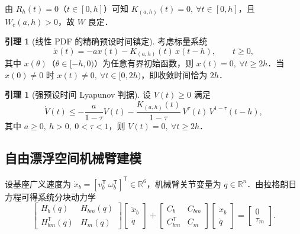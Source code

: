 \documentclass[12pt,a4paper]{article}
\theoremstyle{definition}
\newtheorem{lemma}[theorem]{引理}
\theoremstyle{remark}
\newcommand{\R}{\mathbb{R}}
\newcommand{\T}{\mathsf{T}}
\begin{document}
由 $R_h(t)=0$（$t\in[0,h]$）可知 $K_{(a,h)}(t)=0,\ \forall t\in[0,h]$，且 $W_c(a,h)>0$，故 $W$ 良定．

\begin{lemma}[线性 PDF 的精确预设时间镇定\cite{zhou2022}]
考虑标量系统
\begin{equation}
  \dot x(t)=-a x(t)-K_{(a,h)}(t)\,x(t-h),\qquad t\ge 0,
\end{equation}
其中 $x(\theta)$（$\theta\in[-h,0)$）为任意有界初始函数，则 $x(t)=0,\ \forall t\ge 2h$．当 $x(0)\ne 0$ 时 $x(t)\ne 0,\ \forall t\in[0,2h)$，即收敛时间恰为 $2h$．
\end{lemma}

\begin{lemma}[强预设时间 Lyapunov 判据\cite{ding2024}]
设 $V(t)\ge 0$ 满足
\begin{equation}
  \dot V(t)\le -\frac{a}{1-\tau}V(t)-\frac{K_{(a,h)}(t)}{1-\tau}\,V^{\tau}(t)\,V^{1-\tau}(t-h),
\end{equation}
其中 $a\ge 0,\ h>0,\ 0<\tau<1$，则 $V(t)=0,\ \forall t\ge 2h$．
\end{lemma}

\subsection{自由漂浮空间机械臂建模}

设基座广义速度为 $\dot x_b=[v_b^\T\ \omega_b^\T]^\T\in\R^6$，机械臂关节变量为 $q\in\R^n$．由拉格朗日方程可得系统分块动力学\cite{yanyuxin2025}
\begin{equation}
  \begin{bmatrix}
    H_b(q) & H_{bm}(q)\\
    H_{bm}^\T(q) & H_m(q)
  \end{bmatrix}
  \begin{bmatrix}
    \ddot x_b\\[2pt] \ddot q
  \end{bmatrix}
  +
  \begin{bmatrix}
    C_b & C_{bm}\\
    C_{bm}^\T & C_m
  \end{bmatrix}
  \begin{bmatrix}
    \dot x_b\\[2pt] \dot q
  \end{bmatrix}
  =
  \begin{bmatrix}
    0\\[2pt] \tau_m
  \end{bmatrix} .
\end{equation}
\end{document}
